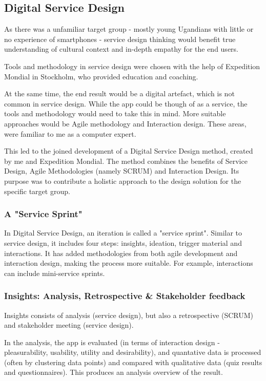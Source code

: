 \subsection{Digital Service Design}

As there was a unfamiliar target group - mostly young Ugandians with little or no experience of smartphones - service design thinking would benefit true understanding of cultural context and in-depth empathy for the end users.

Tools and methodology in service design were chosen with the help of Expedition Mondial in Stockholm, who provided education and coaching.

At the same time, the end result would be a digital artefact, which is not common in service design. While the app could be though of as a service, the tools and methodology would need to take this in mind. More suitable approaches would be Agile methodology and Interaction design. These areas, were familiar to me as a computer expert.

This led to the joined development of a Digital Service Design method, created by me and Expedition Mondial. The method combines the benefits of Service Design, Agile Methodologies (namely SCRUM) and Interaction Design. Its purpose was to contribute a holistic approach to the design solution for the specific target group. \cite{nissar-linkedin}

\subsubsection{A "Service Sprint"}
In Digital Service Design, an iteration is called a "service sprint". Similar to service design, it includes four steps: insights, ideation, trigger material and interactions. It has added methodologies from both agile development and interaction design, making the process more suitable. For example, interactions can include mini-service sprints.

\subsubsection{Insights: Analysis, Retrospective \& Stakeholder feedback}
  Insights consists of analysis (service design), but also a retrospective (SCRUM) and stakeholder meeting (service design).

    In the analysis, the app is evaluated (in terms of interaction design - pleasurability, usability, utility and desirability), and quantative data is processed (often by clustering data points) and compared with qualitative data (quiz results and questionnaires). This produces an analysis overview of the result.

